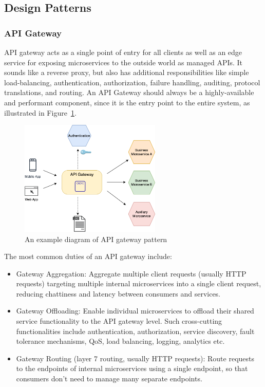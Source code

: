 \documentclass{Configuration_Files/PoliMi3i_thesis}
\begin{document}
\subsection{Design Patterns}
\label{subsec:designpattern}

\subsubsection{API Gateway}
\label{subsubsec:api_gateway}

API gateway acts as a single point of entry for all clients as well as an edge service for exposing microservices to the outside world as managed APIs.
It sounds like a reverse proxy, but also has additional responsibilities like simple load-balancing, authentication, authorization, failure handling, auditing, protocol translations, and routing. An API Gateway should always be a highly-available and performant component, since it is the entry point to the entire system, as illustrated in Figure~\ref{fig:api_gateway}.

\begin{figure}[H]
    \centering
    \includegraphics[width=0.6\textwidth]{myImages/APIgw.png}
    \caption{An example diagram of API gateway pattern}
    \label{fig:api_gateway}
\end{figure}

The most common duties of an API gateway include:

\begin{itemize}
    \item Gateway Aggregation: Aggregate multiple client requests (usually HTTP requests) targeting multiple internal microservices into a single client request, reducing chattiness and latency between consumers and services.
    
    \item Gateway Offloading: Enable individual microservices to offload their shared service functionality to the API gateway level.
    Such cross-cutting functionalities include authentication, authorization, service discovery, fault tolerance mechanisms, QoS, load balancing, logging, analytics etc.
    
    \item Gateway Routing (layer 7 routing, usually HTTP requests): Route requests to the endpoints of internal microservices using a single endpoint, so that consumers don’t need to manage many separate endpoints.
\end{itemize}
\end{document}
